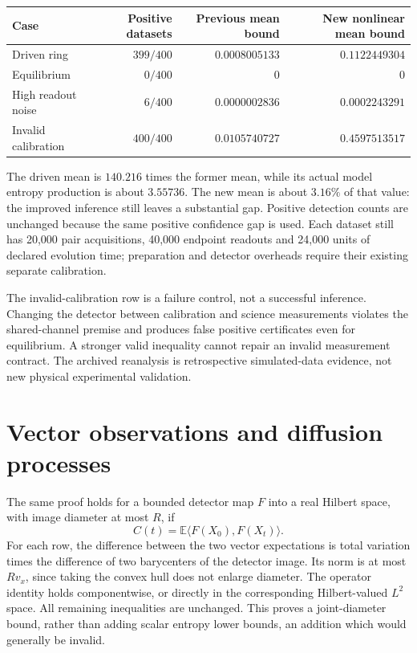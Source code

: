 \begin{center}
\begin{tabular}{lrrr}
Case & Positive datasets & Previous mean bound & New nonlinear mean bound\\
\hline
Driven ring & $399/400$ & $0.0008005133$ & $0.1122449304$\\
Equilibrium & $0/400$ & $0$ & $0$\\
High readout noise & $6/400$ & $0.0000002836$ & $0.0002243291$\\
Invalid calibration & $400/400$ & $0.0105740727$ & $0.4597513517$\\
\end{tabular}
\end{center}

The driven mean is $140.216$ times the former mean, while its actual model
entropy production is about $3.55736$. The new mean is about $3.16\%$ of
that value: the improved inference still leaves a substantial gap. Positive
detection counts are unchanged because the same positive confidence gap is
used. Each dataset still has 20,000 pair acquisitions, 40,000 endpoint
readouts and 24,000 units of declared evolution time; preparation and detector
overheads require their existing separate calibration.

The invalid-calibration row is a failure control, not a successful inference.
Changing the detector between calibration and science measurements violates
the shared-channel premise and produces false positive certificates even
for equilibrium. A stronger valid inequality cannot repair an invalid
measurement contract. The archived reanalysis is retrospective simulated-data
evidence, not new physical experimental validation.

\section{Vector observations and diffusion processes}

The same proof holds for a bounded detector map $F$ into a real Hilbert space,
with image diameter at most $R$, if
\[
 C(t)=\mathbb E\langle F(X_0),F(X_t)\rangle.
\]
For each row, the difference between the two vector expectations is total
variation times the difference of two barycenters of the detector image.
Its norm is at most $R v_x$, since taking the convex hull does not enlarge
diameter. The operator identity holds componentwise, or directly in the
corresponding Hilbert-valued $L^2$ space. All remaining inequalities are
unchanged. This proves a joint-diameter bound, rather than adding scalar
entropy lower bounds, an addition which would generally be invalid.

